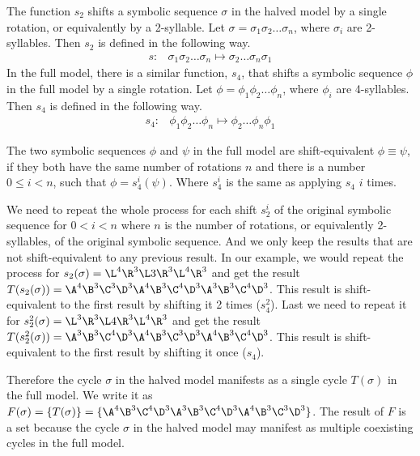 \begin{definition}
	The function $s_2$ shifts a symbolic sequence $\sigma$ in the halved model by a single rotation, or equivalently by a 2-syllable.
	Let $\sigma = \sigma_1\sigma_2 \dots \sigma_n$, where $\sigma_i$ are 2-syllables.
	Then $s_2$ is defined in the following way.
	\begin{align}
		s: & \sigma_1\sigma_2 \dots \sigma_n \mapsto \sigma_2 \dots \sigma_n\sigma_1
	\end{align}
	In the full model, there is a similar function, $s_4$, that shifts a symbolic sequence $\phi$ in the full model by a single rotation.
	Let $\phi = \phi_1\phi_2 \dots \phi_n$, where $\phi_i$ are 4-syllables.
	Then $s_4$ is defined in the following way.
	\begin{align}
		s_4: & \phi_1\phi_2 \dots \phi_n \mapsto \phi_2 \dots \phi_n\phi_1
	\end{align}
\end{definition}

\begin{definition}
	The two symbolic sequences $\phi$ and $\psi$ in the full model are shift-equivalent $\phi \equiv \psi$,
	if they both have the same number of rotations $n$
	and there is a number $0 \leq i < n$, such that $\phi = s_4^i(\psi)$.
	Where $s_4^i$ is the same as applying $s_4$ $i$ times.
\end{definition}

We need to repeat the whole process for each shift $s_2^i$ of the original symbolic sequence for $0 < i < n$ where $n$ is the number of rotations, or equivalently 2-syllables, of the original symbolic sequence.
And we only keep the results that are not shift-equivalent to any previous result.
In our example, we would repeat the process for $s_2(\sigma) = \L^4\R^3\L3\R^3\L^4\R^3$ and get the result $T(s_2(\sigma)) = \A^4\B^3\C^3\D^3\A^4\B^3\C^4\D^3\A^3\B^3\C^4\D^3$.
This result is shift-equivalent to the first result by shifting it 2 times ($s_4^2$).
Last we need to repeat it for $s_2^2(\sigma) = \L^3\R^3\L4\R^3\L^4\R^3$ and get the result $T(s_2^2(\sigma)) = \A^3\B^3\C^4\D^3\A^4\B^3\C^3\D^3\A^4\B^3\C^4\D^3$.
This result is shift-equivalent to the first result by shifting it once ($s_4$).

Therefore the cycle $\sigma$ in the halved model manifests as a single cycle $T(\sigma)$ in the full model.
We write it as $F(\sigma) = \{T(\sigma)\} = \{\A^4\B^3\C^4\D^3\A^3\B^3\C^4\D^3\A^4\B^3\C^3\D^3\}$.
The result of $F$ is a set because the cycle $\sigma$ in the halved model may manifest as multiple coexisting cycles in the full model.

